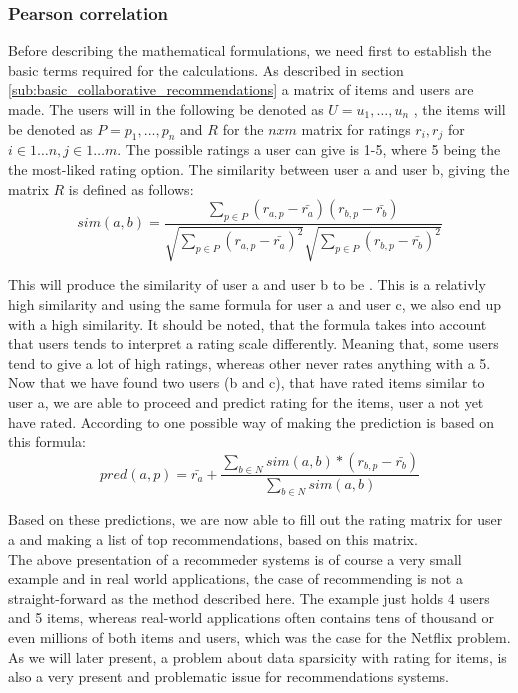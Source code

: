 \subsubsection{Pearson correlation}
Before describing the mathematical formulations, we need first to establish the basic terms required for the calculations. As described in section \ref{sub:basic_collaborative_recommendations} a matrix of items and users are made. The users will in the following be denoted as \( U = {u_{1}, \ldots , u_{n}} \) , the items will be denoted as \( P = {p_{1}, \ldots , p_{n}} \) and \(R\) for the \({n x m}\) matrix for ratings \(r_{i}, r_{j}\) for \(i \in 1 \ldots n, j \in 1 \ldots m\). The possible ratings a user can give is 1-5, where 5 being the the most-liked rating option. 
The similarity between user a and user b, giving the matrix \(R\) is defined as follows:\\

\[
	sim(a,b) = \frac{\sum_{p\in P} (r_{a,p} - \bar{r_{a}})(r_{b,p} - \bar{r_{b}})}{\sqrt{\sum_{p\in P} (r_{a,p} - \bar{r_{a}})^2} \sqrt{\sum_{p\in P} (r_{b,p} - \bar{r_{b}})^2}}
\]


This will produce the similarity of user a and user b to be . This is a relativly high similarity and using the same formula for user a and user c, we also end up with a high similarity. It should be noted, that the formula takes into account that users tends to interpret a rating scale differently. Meaning that, some users tend to give a lot of high ratings, whereas other never rates anything with a 5. 
Now that we have found two users (b and c), that have rated items similar to user a, we are able to proceed and predict rating for the items, user a not yet have rated. According to  one possible way of making the prediction is based on this formula:\\

\[
	pred(a,p) = \bar{r_{a}} + \frac{\sum_{b\in N} sim(a,b) * (r_{b,p} - \bar{r_{b}})}{\sum_{b\in N} sim(a,b)}
\]

Based on these predictions, we are now able to fill out the rating matrix for user a and making a list of top recommendations, based on this matrix. \\

The above presentation of a recommeder systems is of course a very small example and in real world applications, the case of recommending is not a straight-forward as the method described here. The example just holds 4 users and 5 items, whereas real-world applications often contains tens of thousand or even millions of both items and users, which was the case for the Netflix problem. As we will later present, a problem about data sparsicity with rating for items, is also a very present and problematic issue for recommendations systems.  

